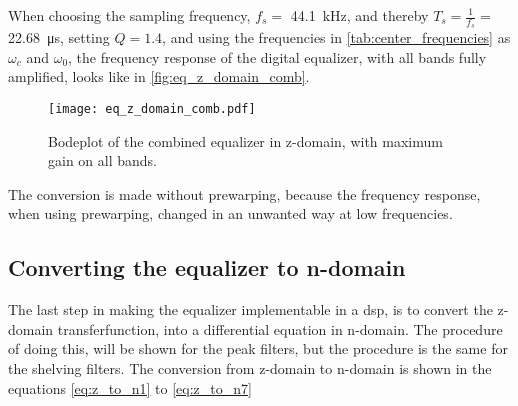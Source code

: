 When choosing the sampling frequency, $f_s =$ \SI{44.1}{\kilo \hertz}, and thereby $T_s = \frac{1}{f_s} =$ \SI{22.68}{\micro \second}, setting $Q = 1.4$, and using the frequencies in \autoref{tab:center_frequencies} as $\omega_c$ and $\omega_0$, the frequency response of the digital equalizer, with all bands fully amplified, looks like in \autoref{fig:eq_z_domain_comb}.

\begin{figure}[!h]
    \centering
        \texttt{[image: eq\_z\_domain\_comb.pdf]}
        \caption{Bodeplot of the combined equalizer in z-domain, with maximum gain on all bands.}
        \label{fig:eq_z_domain_comb}
  \end{figure}

The conversion is made without prewarping, because the frequency response, when using prewarping, changed in an unwanted way at low frequencies.

\subsection{Converting the equalizer to n-domain}
The last step in making the equalizer implementable in a \gls{dsp}, is to convert the z-domain transferfunction, into a differential equation in n-domain. The procedure of doing this, will be shown for the peak filters, but the procedure is the same for the shelving filters. The conversion from z-domain to n-domain is shown in the equations \autoref{eq:z_to_n1} to \autoref{eq:z_to_n7} 

